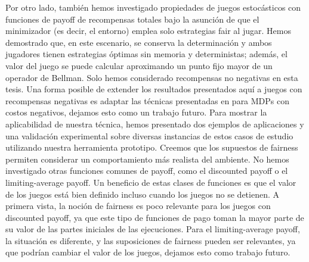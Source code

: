 Por otro lado, también hemos investigado propiedades de juegos estocásticos con funciones de payoff de recompensas totales bajo la asunción de que el minimizador (es decir, el entorno) emplea solo estrategias fair al jugar.  
Hemos demostrado que, en este escenario, se conserva la determinación y ambos jugadores tienen estrategias óptimas sin memoria y deterministas; además, el valor del juego se puede calcular aproximando un punto fijo mayor de un operador de Bellman. Solo hemos considerado recompensas no negativas en esta tesis. Una forma posible de extender los resultados presentados aquí a juegos con recompensas negativas es adaptar las técnicas presentadas en \cite{DBLP:conf/lics/Baier0DGS18} para MDPs con costos negativos, dejamos esto como un trabajo futuro.
Para mostrar la aplicabilidad de nuestra técnica, hemos presentado dos ejemplos de aplicaciones y una validación experimental sobre diversas instancias de estos casos de estudio utilizando nuestra herramienta prototipo. Creemos que los supuestos de fairness permiten considerar un comportamiento más realista del ambiente.
No hemos investigado otras funciones comunes de payoff, como el discounted payoff o el limiting-average payoff. Un beneficio de estas clases de funciones es que el valor de los juegos está bien definido incluso cuando los juegos no se detienen.
A primera vista, la noción de fairness es poco relevante para los juegos con discounted payoff, ya que este tipo de funciones de pago toman la mayor parte de su valor de las partes iniciales de las ejecuciones. Para el limiting-average payoff, la situación es diferente, y las suposiciones de fairness pueden ser relevantes, ya que podrían cambiar el valor de los juegos, dejamos esto como trabajo futuro.

